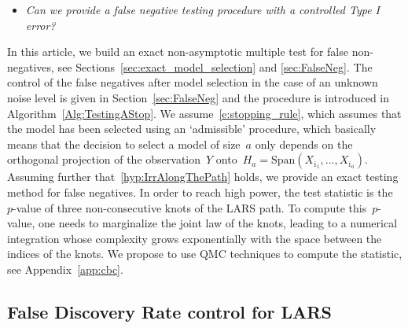 \documentclass[final,numbib]{imaiai}%
\numberwithin{equation}{section}
\renewcommand{\bar}{\overline}
\newcommand{\<}{\langle}
\renewcommand{\>}{\rangle}
\newcommand{\1}{\mathds{1}}
\begin{document}
{{{\begin{itemize}
\item[\bf{[Q5]}]
{\it 
Can we provide a false negative testing procedure with a controlled Type I error?}
\end{itemize}

In this article, we build an exact non-asymptotic multiple test for false non-negatives, see Sections~\ref{sec:exact_model_selection} and \ref{sec:FalseNeg}.
The control of the false negatives after model selection in the case  of an unknown noise level is given in Section~\ref{sec:FalseNeg} and the procedure is introduced in Algorithm~\ref{Alg:TestingAStop}.
We assume~\eqref{e:stopping_rule}, which assumes that the model has been selected using an `admissible' procedure, which basically means that the decision to select a model of size~$a$ only depends on the orthogonal projection of the observation~$Y$ onto~$H_a=\mathrm{Span}(X_{\bar\imath_1},\ldots,X_{\bar\imath_a})$.
Assuming further that~\eqref{hyp:IrrAlongThePath} holds, we provide an exact testing method for false negatives.
In order to reach high power, the test statistic is the~$p$-value of three non-consecutive knots of the LARS path.
To compute this~$p$-value, one needs to marginalize the joint law of the knots, leading to a numerical integration whose complexity grows exponentially with the space between the indices of the knots.
We propose to use QMC techniques to compute the statistic, see Appendix~\ref{app:cbc}.

\subsection{False Discovery Rate control for LARS}

}}}
\end{document}
